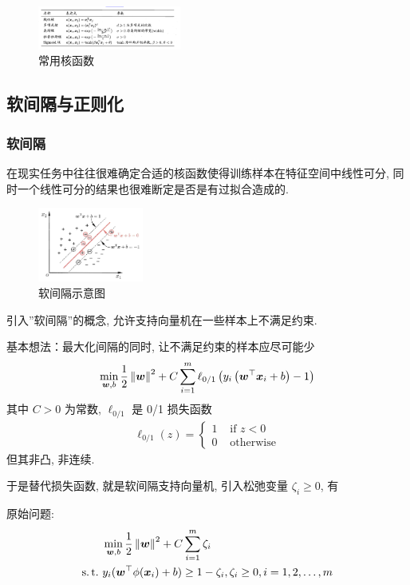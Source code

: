 \begin{figure}[!htb]
    \centering
    \includegraphics[width=0.42\textwidth]{pic/ML6/常用核函数}
    \caption{常用核函数}
\end{figure}


\subsection{软间隔与正则化}
\subsubsection{软间隔}
在现实任务中往往很难确定合适的核函数使得训练样本在特征空间中线性可分, 同时一个线性可分的结果也很难断定是否是有过拟合造成的.

\begin{figure}[!htb]
    \centering
    \includegraphics[width=0.309\textwidth]{pic/ML6/软间隔示意图}
    \caption{软间隔示意图}
\end{figure}
引入”软间隔”的概念, 允许支持向量机在一些样本上不满足约束.

基本想法：最大化间隔的同时, 让不满足约束的样本应尽可能少
\begin{align*}
    \min_{\bm{w}, b}\frac{1}{2}\left\lVert\bm{w}\right\rVert^2+C\sum_{i=1}^m\ell_{0/1}\left( y_i\left( \bm{w}^\top \bm{x}_i+b \right)-1 \right)
\end{align*}
其中 $C>0$ 为常数, $\ell_{0/1}$ 是 0/1 损失函数
\begin{align*}
    \ell_{0/1}(z)=\left\{ \begin{array}{ll}
        1 & \text{ if }z<0\\
        0 &\text{ otherwise}
    \end{array} \right.
\end{align*}
但其非凸, 非连续. 

于是替代损失函数, 就是软间隔支持向量机, 引入松弛变量 $\zeta_i\ge 0$, 有

原始问题:
\begin{align*}
    &\min_{\bw,b}\frac{1}{2}\norm{\bw}^2+C\sum_{i=1}^m\zeta_i\\
    \st& y_i(\bw^\top \phi(\bx_i)+b)\ge 1-\zeta_i, \zeta_i\ge 0,i=1,2,\dots,m
\end{align*}

